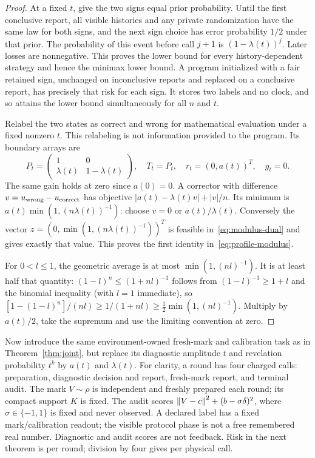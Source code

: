 \begin{proof}
At a fixed $t$, give the two signs equal prior probability. Until the first conclusive report, all visible histories and any private randomization have the same law for both signs, and the next sign choice has error probability $1/2$ under that prior. The probability of this event before call $j+1$ is $(1-\lambda(t))^j$. Later losses are nonnegative. This proves the lower bound for every history-dependent strategy and hence the minimax lower bound. A program initialized with a fair retained sign, unchanged on inconclusive reports and replaced on a conclusive report, has precisely that risk for each sign. It stores two labels and no clock, and so attains the lower bound simultaneously for all $n$ and $t$.

Relabel the two states as correct and wrong for mathematical evaluation under a fixed nonzero $t$. This relabeling is not information provided to the program. Its boundary arrays are
\[
 P_t=\begin{pmatrix}1&0\\\lambda(t)&1-\lambda(t)\end{pmatrix},
 \quad T_t=P_t,\quad r_t=(0,a(t))^T,\quad g_t=0.
\]
The same gain holds at zero since $a(0)=0$. A corrector with difference $v=u_{\rm wrong}-u_{\rm correct}$ has objective
$|a(t)-\lambda(t)v|+|v|/n$. Its minimum is
$a(t)\min(1,(n\lambda(t))^{-1})$: choose $v=0$ or $a(t)/\lambda(t)$. Conversely the vector
$z=(0,\min(1,(n\lambda(t))^{-1}))^T$
is feasible in~\eqref{eq:modulus-dual} and gives exactly that value. This proves the first identity in~\eqref{eq:profile-modulus}.

For $0<l\le1$, the geometric average is at most $\min(1,(nl)^{-1})$. It is at least half that quantity: $(1-l)^n\le(1+nl)^{-1}$ follows from $(1-l)^{-1}\ge1+l$ and the binomial inequality (with $l=1$ immediate), so
$[1-(1-l)^n]/(nl)\ge1/(1+nl)\ge\tfrac12\min(1,(nl)^{-1})$.
Multiply by $a(t)/2$, take the supremum and use the limiting convention at zero.
\end{proof}

Now introduce the same environment-owned fresh-mark and calibration task as in Theorem~\ref{thm:joint}, but replace its diagnostic amplitude $t$ and revelation probability $t^k$ by $a(t)$ and $\lambda(t)$. For clarity, a round has four charged calls: preparation, diagnostic decision and report, fresh-mark report, and terminal audit. The mark $V\sim\rho$ is independent and freshly prepared each round; its compact support $K$ is fixed. The audit scores
$\left\lVert V-c\right\rVert^2+(b-\sigma\delta)^2$,
where $\sigma\in\{-1,1\}$ is fixed and never observed. A declared label has a fixed mark/calibration readout; the visible protocol phase is not a free remembered real number. Diagnostic and audit scores are not feedback. Risk in the next theorem is per round; division by four gives per physical call.

